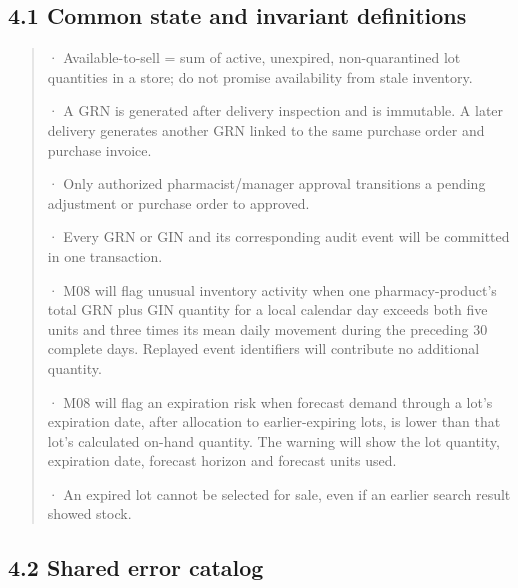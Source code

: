 \subsection{4.1 Common state and invariant definitions}\label{common-state-and-invariant-definitions}

\begin{quote}
· Available-to-sell = sum of active, unexpired, non-quarantined lot quantities in a store; do not promise availability from stale inventory.

· A GRN is generated after delivery inspection and is immutable. A later delivery generates another GRN linked to the same purchase order and purchase invoice.

· Only authorized pharmacist/manager approval transitions a pending adjustment or purchase order to approved.

· Every GRN or GIN and its corresponding audit event will be committed in one transaction.

· M08 will flag unusual inventory activity when one pharmacy-product's total GRN plus GIN quantity for a local calendar day exceeds both five units and three times its mean daily movement during the preceding 30 complete days. Replayed event identifiers will contribute no additional quantity.

· M08 will flag an expiration risk when forecast demand through a lot's expiration date, after allocation to earlier-expiring lots, is lower than that lot's calculated on-hand quantity. The warning will show the lot quantity, expiration date, forecast horizon and forecast units used.

· An expired lot cannot be selected for sale, even if an earlier search result showed stock.
\end{quote}

\subsection{4.2 Shared error catalog}\label{shared-error-catalog}

